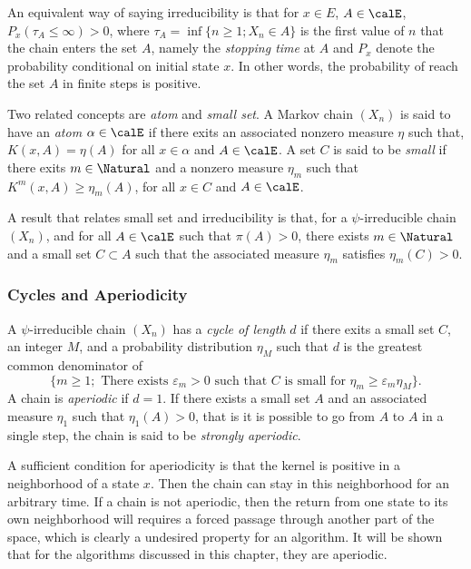 An equivalent way of saying irreducibility is that for $x\in E$, $A\in\calE$,
$P_x(\tau_A\le\infty) > 0$, where $\tau_A = \inf\{n\ge1;X_n\in A\}$ is the
first value of $n$ that the chain enters the set $A$, namely the
\emph{stopping time} at $A$ and $P_x$ denote the probability conditional on
initial state $x$. In other words, the probability of reach the set $A$ in
finite steps is positive.

Two related concepts are \emph{atom} and \emph{small set}. A Markov chain
$(X_n)$ is said to have an \emph{atom} $\alpha\in\calE$  if there exits an
associated nonzero measure $\eta$ such that, $K(x,A) = \eta(A)$ for all
$x\in\alpha$ and $A\in\calE$. A set $C$ is said to be \emph{small} if there
exits $m\in\Natural$ and a nonzero measure $\eta_m$ such that
$K^m(x,A)\ge\eta_m(A)$, for all $x\in C$ and $A\in\calE$.

A result that relates small set and irreducibility is that, for a
$\psi$-irreducible chain $(X_n)$, and for all $A\in\calE$ such that
$\pi(A)>0$, there exists $m\in\Natural$ and a small set $C\subset A$ such that
the associated measure $\eta_m$ satisfies $\eta_m(C) > 0$.

\subsubsection{Cycles and Aperiodicity}

A $\psi$-irreducible chain $(X_n)$ has a \emph{cycle of length} $d$ if there
exits a small set $C$, an integer $M$, and a probability distribution $\eta_M$
such that $d$ is the greatest common denominator of
\begin{equation*}
  \{m\ge1;\text{ There exists }\varepsilon_m > 0\text{ such that }C\text{ is
    small for }\eta_m\ge\varepsilon_m\eta_M\}.
\end{equation*}
A chain is \emph{aperiodic} if $d = 1$. If there exists a small set $A$ and an
associated measure $\eta_1$ such that $\eta_1(A) > 0$, that is it is possible
to go from $A$ to $A$ in a single step, the chain is said to be
\emph{strongly aperiodic}.

A sufficient condition for aperiodicity is that the kernel is positive in a
neighborhood of a state $x$. Then the chain can stay in this neighborhood for
an arbitrary time. If a chain is not aperiodic, then the return from one state
to its own neighborhood will requires a forced passage through another part of
the space, which is clearly a undesired property for an \mcmc algorithm. It
will be shown that for the algorithms discussed in this chapter, they are
aperiodic.


